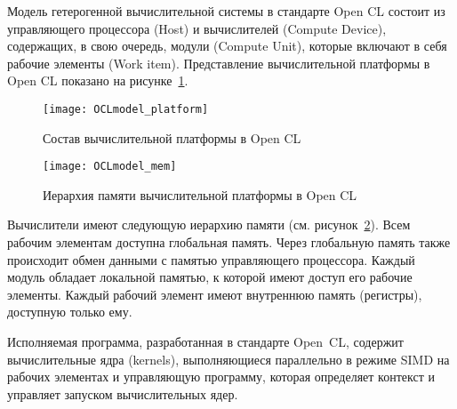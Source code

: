 Модель гетерогенной вычислительной системы в стандарте Open CL 
состоит из управляющего процессора (Host)
и вычислителей (Compute Device),
содержащих, в свою очередь, 
модули (Compute Unit),
которые включают в себя %
рабочие элементы (Work item).
Представление вычислительной платформы в Open CL
показано на рисунке~\ref{fig:OCL_platform}.

\begin{figure}[h!]
  \centering
  \texttt{[image: OCLmodel\_platform]} 
  \caption{Состав вычислительной платформы в Open CL}
  \label{fig:OCL_platform}
\end{figure}
\FloatBarrier

\begin{figure}[h!]
  \centering
  \texttt{[image: OCLmodel\_mem]} 
  \caption{Иерархия памяти вычислительной платформы в Open CL}
  \label{fig:OCLmodel_mem} %
\end{figure}
\FloatBarrier




Вычислители
имеют следующую иерархию памяти 
(см. рисунок~\ref{fig:OCLmodel_mem}).
Всем рабочим элементам доступна глобальная память. 
Через глобальную память также происходит обмен данными
с памятью управляющего процессора. 
Каждый модуль 
обладает локальной памятью, к которой имеют доступ
его рабочие элементы.
Каждый рабочий элемент имеют внутреннюю  память (регистры), доступную только ему.

Исполняемая программа, разработанная в стандарте Open~CL,
содержит %
вычислительные ядра (kernels), выполняющиеся
параллельно 
в режиме SIMD  
на рабочих элементах  %
и управляющую программу, которая
определяет контекст и 
управляет запуском вычислительных ядер.




